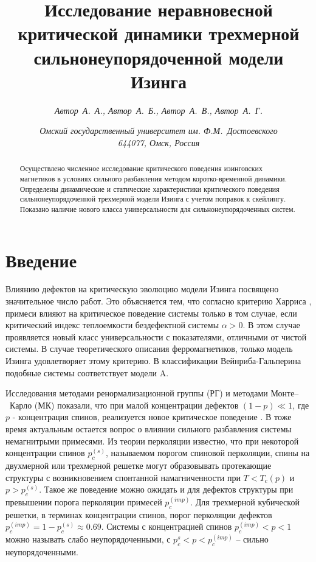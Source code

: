\documentclass[12pt,a4paper]{article}
\title{\bf Исследование неравновесной критической динамики трехмерной сильнонеупорядоченной модели Изинга}
\author{\it Автор~А.~А., Автор~А.~Б., Автор~А.~В., Автор~А.~Г.}
\date{\textit{\small Омский государственный университет им. Ф.М.~Достоевского \\644077, Омск, Россия}}
\begin{document}
\maketitle
\thispagestyle{headings} %

\begin{abstract}
Осуществлено численное исследование критического поведения изинговских магнетиков в условиях сильного разбавления методом коротко-временной динамики. Определены динамические и статические характеристики критического поведения сильнонеупорядоченной трехмерной модели Изинга с  учетом поправок к скейлингу. Показано наличие нового класса универсальности для сильнонеупорядоченных систем.
\end{abstract}


\section{Введение}

Влиянию дефектов на критическую эволюцию модели Изинга посвящено значительное число работ. Это объясняется тем, что согласно критерию Харриса \cite{lit:Harris}, примеси влияют на критическое поведение системы только в том случае, если критический индекс теплоемкости бездефектной системы $\alpha > 0$. В этом случае проявляется новый класс универсальности с показателями, отличными от чистой системы. В случае теоретического описания ферромагнетиков, только модель Изинга удовлетворяет этому критерию. В классификации Вейнриба-Гальперина \cite{lit:HalperinHoenberg} подобные системы соответствует модели A.

Исследования методами ренормализационной группы (РГ) и методами Монте\cdash--~{}Карло (МК) показали, что при малой концентрации дефектов $(1-p) \ll 1$, где $p$ - концентрация спинов, реализуется новое критическое поведение \cite{lit:Folk}. В тоже время актуальным остается вопрос о влиянии сильного разбавления системы немагнитрыми примесями. Из теории перколяции известно, что при некоторой концентрации спинов $p^{(s)}_{c}$, называемом порогом спиновой перколяции, спины на двухмерной или трехмерной решетке могут образовывать протекающие структуры с возникновением спонтанной намагниченности при $T < T_c(p)$ и $p > p^{(s)}_{c}$. Такое же поведение можно ожидать и для дефектов структуры при превышении порога перколяции примесей $p^{(imp)}_{c}$. Для трехмерной кубической решетки, в терминах концентрации спинов, порог перколяции дефектов $p^{(imp)}_{c} = 1 - p^{(s)}_{c} \approx 0.69$. Системы с концентрацией спинов $p^{(imp)}_{c} < p < 1$ можно называть слабо неупорядоченными, с $p_{c}^{s} < p < p_{c}^{(imp)}$ -- сильно неупорядоченными.
\end{document}
